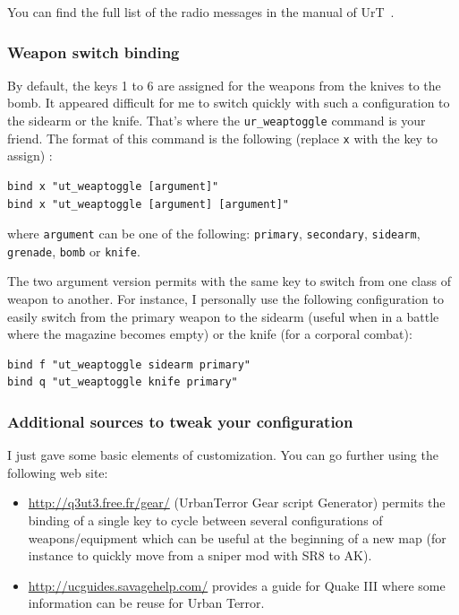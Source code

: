 You can find the full list of the radio messages in the manual of
UrT~\cite{urt}. 

\subsubsection{Weapon switch binding}
\label{sub:weapon}

By default, the keys 1 to 6 are assigned for the weapons from the knives to the
bomb. It appeared difficult for me to switch quickly with such a configuration
to the sidearm or the knife. That's where the \texttt{ur\_weaptoggle} command is
your friend. 
The format of this command is the following (replace \texttt{x} with the key to assign) : 
\begin{verbatim}
bind x "ut_weaptoggle [argument]"
bind x "ut_weaptoggle [argument] [argument]"
\end{verbatim}
where \texttt{argument} can be one of the following: \texttt{primary},
\texttt{secondary}, \texttt{sidearm}, \texttt{grenade}, \texttt{bomb} or
\texttt{knife}. 

The two argument version permits with the same key to switch from one class of
weapon to another.
For instance, I personally use the following configuration to easily switch from
the primary weapon to the sidearm (useful when in a battle where the magazine
becomes empty) or the knife (for a corporal combat): 
\begin{lstlisting}[style=filecontent]
bind f "ut_weaptoggle sidearm primary"
bind q "ut_weaptoggle knife primary"
\end{lstlisting}

\subsubsection{Additional sources to tweak your configuration}

I just gave some basic elements of customization. 
You can go further using the following web site: 
\begin{itemize}\setitemsep
\item \url{http://q3ut3.free.fr/gear/} (UrbanTerror Gear script Generator)
  permits the binding of a single key to cycle between several configurations of
  weapons/equipment which can be useful at the beginning of a new map (for
  instance to quickly move from a sniper mod with SR8 to AK).
\item \url{http://ucguides.savagehelp.com/} provides a guide for Quake III where
  some information can be reuse for Urban Terror.
\end{itemize}

